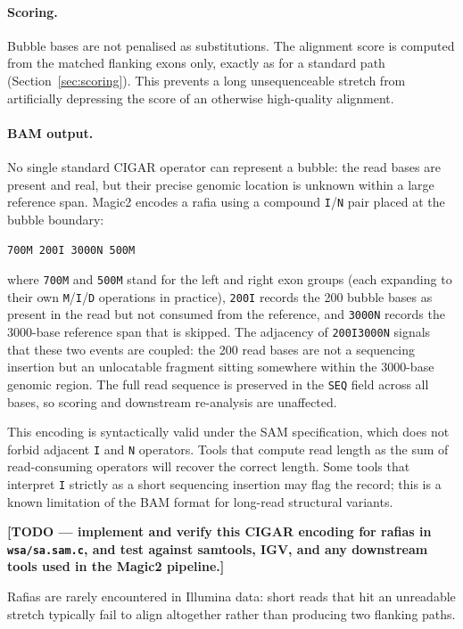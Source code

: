 \documentclass[11pt]{article}
\begin{document}
\paragraph{Scoring.}
Bubble bases are not penalised as substitutions.
The alignment score is computed from the matched flanking exons
only, exactly as for a standard path
(Section~\ref{sec:scoring}).
This prevents a long unsequenceable stretch from artificially
depressing the score of an otherwise high-quality alignment.

\paragraph{BAM output.}
No single standard CIGAR operator can represent a bubble: the read
bases are present and real, but their precise genomic location is
unknown within a large reference span.
Magic2 encodes a rafia using a compound \texttt{I}/\texttt{N} pair
placed at the bubble boundary:
\begin{center}
\texttt{700M\,200I\,3000N\,500M}
\end{center}
where \texttt{700M} and \texttt{500M} stand for the left and right
exon groups (each expanding to their own \texttt{M}/\texttt{I}/\texttt{D}
operations in practice), \texttt{200I} records the 200 bubble bases
as present in the read but not consumed from the reference, and
\texttt{3000N} records the 3000-base reference span that is skipped.
The adjacency of \texttt{200I3000N} signals that these two events
are coupled: the 200 read bases are not a sequencing insertion but
an unlocatable fragment sitting somewhere within the 3000-base
genomic region.
The full read sequence is preserved in the \texttt{SEQ} field
across all bases, so scoring and downstream re-analysis are
unaffected.

This encoding is syntactically valid under the SAM specification,
which does not forbid adjacent \texttt{I} and \texttt{N} operators.
Tools that compute read length as the sum of read-consuming
operators will recover the correct length.
Some tools that interpret \texttt{I} strictly as a short sequencing
insertion may flag the record; this is a known limitation of the
BAM format for long-read structural variants.

\textbf{[TODO --- implement and verify this CIGAR encoding for
rafias in \texttt{wsa/sa.sam.c}, and test against samtools,
IGV, and any downstream tools used in the Magic2 pipeline.]}

Rafias are rarely encountered in Illumina data: short reads that
hit an unreadable stretch typically fail to align altogether rather
than producing two flanking paths.
\end{document}
